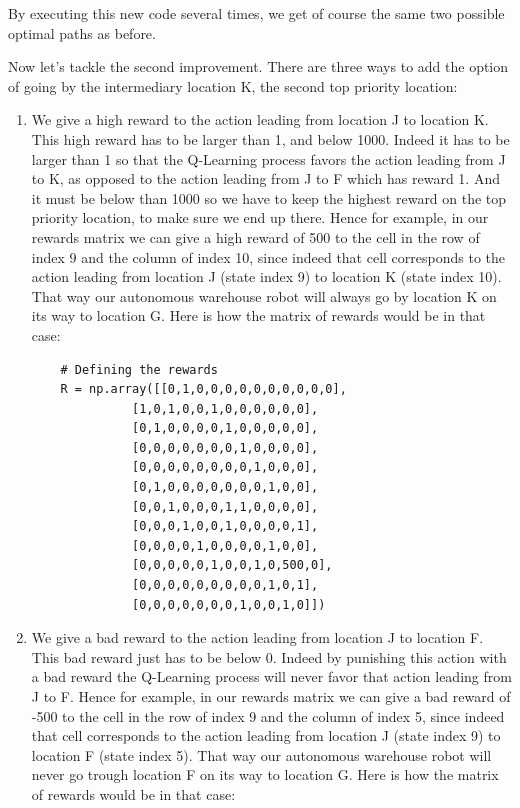 \documentclass[]{book}
\begin{document}
By executing this new code several times, we get of course the same two possible optimal paths as before.

Now let's tackle the second improvement. There are three ways to add the option of going by the intermediary location K, the second top priority location:

\begin{enumerate}
    \item We give a high reward to the action leading from location J to location K. This high reward has to be larger than 1, and below 1000. Indeed it has to be larger than 1 so that the Q-Learning process favors the action leading from J to K, as opposed to the action leading from J to F which has reward 1. And it must be below than 1000 so we have to keep the highest reward on the top priority location, to make sure we end up there. Hence for example, in our rewards matrix we can give a high reward of 500 to the cell in the row of index 9 and the column of index 10, since indeed that cell corresponds to the action leading from location J (state index 9) to location K (state index 10). That way our autonomous warehouse robot will always go by location K on its way to location G. Here is how the matrix of rewards would be in that case:
    \begin{lstlisting}
    # Defining the rewards
    R = np.array([[0,1,0,0,0,0,0,0,0,0,0,0],
              [1,0,1,0,0,1,0,0,0,0,0,0],
              [0,1,0,0,0,0,1,0,0,0,0,0],
              [0,0,0,0,0,0,0,1,0,0,0,0],
              [0,0,0,0,0,0,0,0,1,0,0,0],
              [0,1,0,0,0,0,0,0,0,1,0,0],
              [0,0,1,0,0,0,1,1,0,0,0,0],
              [0,0,0,1,0,0,1,0,0,0,0,1],
              [0,0,0,0,1,0,0,0,0,1,0,0],
              [0,0,0,0,0,1,0,0,1,0,500,0],
              [0,0,0,0,0,0,0,0,0,1,0,1],
              [0,0,0,0,0,0,0,1,0,0,1,0]])
    \end{lstlisting}
    \item We give a bad reward to the action leading from location J to location F. This bad reward just has to be below 0. Indeed by punishing this action with a bad reward the Q-Learning process will never favor that action leading from J to F. Hence for example, in our rewards matrix we can give a bad reward of -500 to the cell in the row of index 9 and the column of index 5, since indeed that cell corresponds to the action leading from location J (state index 9) to location F (state index 5). That way our autonomous warehouse robot will never go trough location F on its way to location G. Here is how the matrix of rewards would be in that case:

\end{enumerate}
\end{document}
